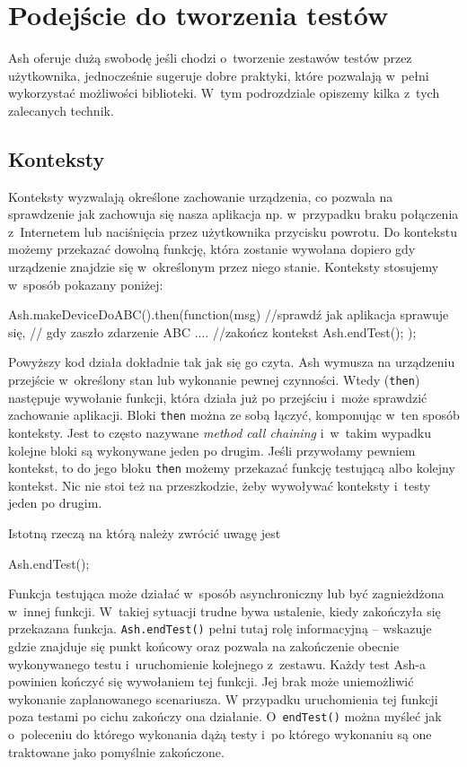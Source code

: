 \documentclass[brudnopis]{xmgr}
\begin{document}
\section{Podejście do tworzenia testów}

Ash oferuje dużą swobodę jeśli chodzi o~tworzenie zestawów testów przez użytkownika, jednocześnie sugeruje dobre praktyki, które pozwalają w~pełni wykorzystać możliwości biblioteki. W~tym podrozdziale opiszemy kilka z~tych zalecanych technik.    

\subsection{Konteksty}

Konteksty wyzwalają określone zachowanie urządzenia, co pozwala na sprawdzenie jak zachowuja się nasza aplikacja np. w~przypadku braku połączenia z~Internetem lub naciśnięcia przez użytkownika przycisku powrotu. Do kontekstu możemy przekazać dowolną funkcję, która zostanie wywołana dopiero gdy urządzenie znajdzie się w~określonym przez niego stanie. Konteksty stosujemy w~sposób pokazany poniżej:

\begin{javascriptcode}
  Ash.makeDeviceDoABC().then(function(msg){
      //sprawdź jak aplikacja sprawuje się, 
      //  gdy zaszło zdarzenie ABC
      ....
      //zakończ kontekst
      Ash.endTest();
  });
\end{javascriptcode}

Powyższy kod działa dokładnie tak jak się go czyta. Ash wymusza na urządzeniu przejście w~określony stan lub wykonanie pewnej czynności. Wtedy (\texttt{then}) następuje wywołanie funkcji, która działa już po przejściu i~może sprawdzić zachowanie aplikacji. Bloki \texttt{then} można ze sobą łączyć, komponując w~ten sposób konteksty. Jest to często nazywane \textit{method call chaining} i~w~takim wypadku kolejne bloki są wykonywane jeden po drugim. Jeśli przywołamy pewniem kontekst, to do jego bloku \texttt{then} możemy przekazać funkcję testującą albo kolejny kontekst. Nic nie stoi też na przeszkodzie, żeby wywoływać konteksty i~testy jeden po drugim. 

Istotną rzeczą na którą należy zwrócić uwagę jest 

\begin{javascriptcode}
   Ash.endTest();
\end{javascriptcode}

Funkcja testująca może działać w~sposób asynchroniczny lub być zagnieżdżona w~innej funkcji. W~takiej sytuacji trudne bywa ustalenie, kiedy zakończyła się przekazana funkcja. \texttt{Ash.endTest()} pełni tutaj rolę informacyjną -- wskazuje gdzie znajduje się punkt końcowy oraz pozwala na zakończenie obecnie wykonywanego testu i~uruchomienie kolejnego z~zestawu. Każdy test Ash-a powinien kończyć się wywołaniem tej funkcji. Jej brak może uniemożliwić wykonanie zaplanowanego scenariusza. W przypadku uruchomienia tej funkcji poza testami po cichu zakończy ona działanie. O~\texttt{endTest()} można myśleć jak o~poleceniu do którego wykonania dążą testy i~po którego wykonaniu są one traktowane jako pomyślnie zakończone. 
\end{document}
